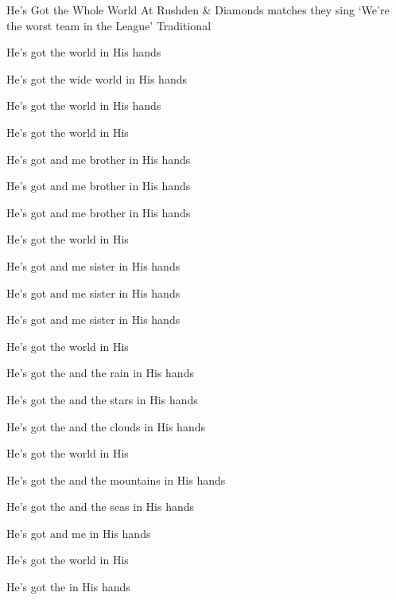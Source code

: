 \begin{SBSong}{He's Got the Whole World}
  {At Rushden \& Diamonds matches they sing `We're the worst team in the League'}
  {Traditional}
  \begin{SBVerse}
    He's got the  world in His hands
    
    He's got the  wide world in His hands

    He's got the  world in His hands

    He's got the  world in His 
  \end{SBVerse}
  \begin{SBVerse}
    He's got  and me brother in His hands

    He's got  and me brother in His hands

    He's got  and me brother in His hands

    He's got the  world in His 
  \end{SBVerse}
  \begin{SBVerse}
    He's got  and me sister in His hands

    He's got  and me sister in His hands

    He's got  and me sister in His hands

    He's got the  world in His 
  \end{SBVerse}
  \begin{SBVerse}
    He's got the  and the rain in His hands

    He's got the  and the stars in His hands

    He's got the  and the clouds in His hands

    He's got the  world in His 
  \end{SBVerse}
  \begin{SBVerse}
    He's got the  and the mountains in His hands

    He's got the  and the seas in His hands

    He's got  and me in His hands

    He's got the  world in His 
  \end{SBVerse}
  \CBPageBrk
  \begin{SBVerse}
    He's got the  in His hands


\end{SBVerse}
\end{SBSong}
